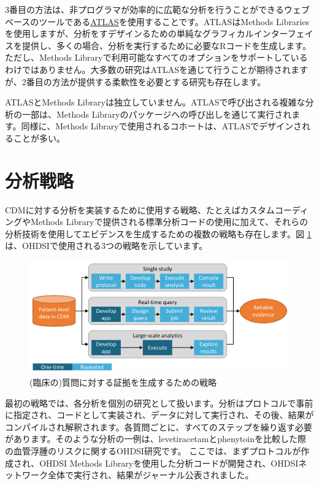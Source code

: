\documentclass[
  11pt]{book}
\theoremstyle{definition}
\theoremstyle{definition}
\theoremstyle{definition}
\theoremstyle{definition}
\theoremstyle{remark}
\begin{document}
3番目の方法は、非プログラマが効率的に広範な分析を行うことができるウェブベースのツールである\href{https://github.com/OHDSI/Atlas/wiki}{ATLAS}を使用することです。ATLASはMethods Librariesを使用しますが、分析をすデザインるための単純なグラフィカルインターフェイスを提供し、多くの場合、分析を実行するために必要なRコードを生成します。ただし、Methods Libraryで利用可能なすべてのオプションをサポートしているわけではありません。大多数の研究はATLASを通じて行うことが期待されますが、2番目の方法が提供する柔軟性を必要とする研究も存在します。

ATLASとMethods Libraryは独立していません。ATLASで呼び出される複雑な分析の一部は、Methods Libraryのパッケージへの呼び出しを通じて実行されます。同様に、Methods Libraryで使用されるコホートは、ATLASでデザインされることが多い。

\section{分析戦略}\label{ux5206ux6790ux6226ux7565}

CDMに対する分析を実装するために使用する戦略、たとえばカスタムコーディングやMethods Libraryで提供される標準分析コードの使用に加えて、それらの分析技術を使用してエビデンスを生成するための複数の戦略も存在します。図 \ref{fig:strategies} は、OHDSIで使用される3つの戦略を示しています。

\begin{figure}

{\centering \includegraphics[width=0.9\linewidth]{images/OhdsiAnalyticsTools/strategies} 

}

\caption{(臨床の)質問に対する証拠を生成するための戦略}\label{fig:strategies}
\end{figure}

最初の戦略では、各分析を個別の研究として扱います。分析はプロトコルで事前に指定され、コードとして実装され、データに対して実行され、その後、結果がコンパイルされ解釈されます。各質問ごとに、すべてのステップを繰り返す必要があります。そのような分析の一例は、levetiracetamとphenytoinを比較した際の血管浮腫のリスクに関するOHDSI研究です\citep{duke_2017}。 ここでは、まずプロトコルが作成され、OHDSI Methods Libraryを使用した分析コードが開発され、OHDSIネットワーク全体で実行され、結果がジャーナル公表されました。
\end{document}
